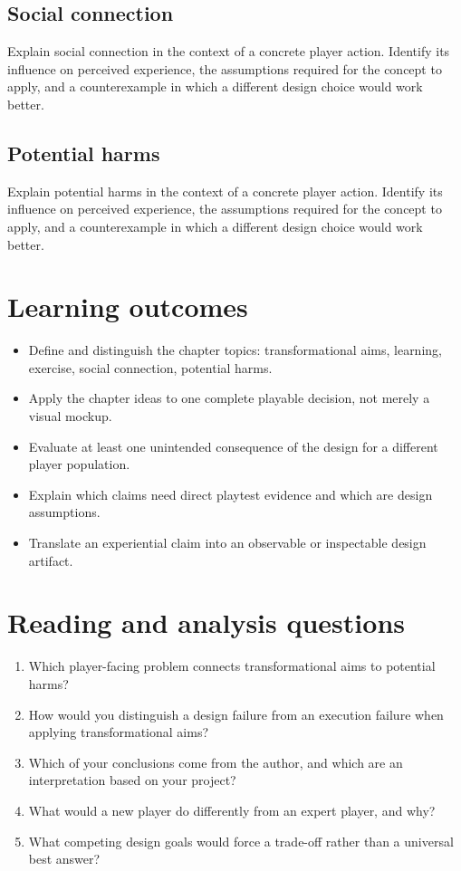 \documentclass[11pt]{article}
\begin{document}
\subsection{Social connection}
Explain social connection in the context of a concrete player action. Identify its influence on perceived experience, the assumptions required for the concept to apply, and a counterexample in which a different design choice would work better.


\subsection{Potential harms}
Explain potential harms in the context of a concrete player action. Identify its influence on perceived experience, the assumptions required for the concept to apply, and a counterexample in which a different design choice would work better.


\section{Learning outcomes}
\begin{itemize}
\item Define and distinguish the chapter topics: transformational aims, learning, exercise, social connection, potential harms.
\item Apply the chapter ideas to one complete playable decision, not merely a visual mockup.
\item Evaluate at least one unintended consequence of the design for a different player population.
\item Explain which claims need direct playtest evidence and which are design assumptions.
\item Translate an experiential claim into an observable or inspectable design artifact.
\end{itemize}

\section{Reading and analysis questions}
\begin{enumerate}
\item Which player-facing problem connects transformational aims to potential harms?
\item How would you distinguish a design failure from an execution failure when applying transformational aims?
\item Which of your conclusions come from the author, and which are an interpretation based on your project?
\item What would a new player do differently from an expert player, and why?
\item What competing design goals would force a trade-off rather than a universal best answer?
\end{enumerate}
\end{document}
